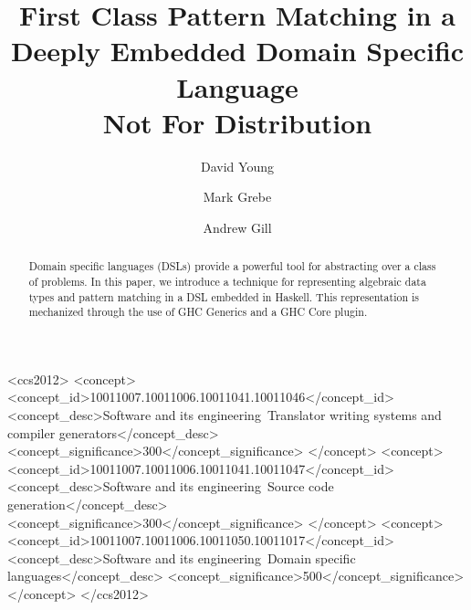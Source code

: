 \documentclass[sigplan,anonymous,review]{acmart}
\begin{document}
\title{First Class Pattern Matching in a Deeply Embedded Domain Specific Language\\
\large{Not For Distribution}}

\author{David Young}


\author{Mark Grebe}

\author{Andrew Gill}

\renewcommand{\shortauthors}{Young, Grebe and Gill}

\begin{abstract}
  Domain specific languages (DSLs) provide a powerful tool for abstracting over
  a class of problems. In this paper, we introduce a technique for representing
  algebraic data types and pattern matching in a DSL embedded in Haskell. This
  representation is mechanized through the use of GHC Generics and a GHC Core plugin.
\end{abstract}

\begin{CCSXML}
<ccs2012>
   <concept>
       <concept_id>10011007.10011006.10011041.10011046</concept_id>
       <concept_desc>Software and its engineering~Translator writing systems and compiler generators</concept_desc>
       <concept_significance>300</concept_significance>
       </concept>
   <concept>
       <concept_id>10011007.10011006.10011041.10011047</concept_id>
       <concept_desc>Software and its engineering~Source code generation</concept_desc>
       <concept_significance>300</concept_significance>
       </concept>
   <concept>
       <concept_id>10011007.10011006.10011050.10011017</concept_id>
       <concept_desc>Software and its engineering~Domain specific languages</concept_desc>
       <concept_significance>500</concept_significance>
       </concept>
 </ccs2012>
\end{CCSXML}
\end{document}

